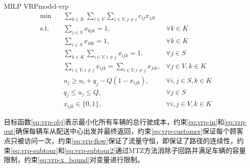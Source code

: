 \begin{model}{MILP VRP}{model-vrp}
\begin{align}
    \min \quad & \sum_{k \in K}\sum_{i \in V}\sum_{j \in V, j \neq i} c_{ij}x_{ijk} & \label{eq:vrp-obj}\\
    \text{s.t.} \quad & \sum_{j \in S} x_{0jk} = 1, & \forall k \in K\label{eq:vrp-in}\\
    \quad & \sum_{i \in S} x_{i0k} = 1, & \forall k \in K\label{eq:vrp-out}\\
    \quad & \sum_{k \in K}\sum_{i \in V, i \neq j} x_{ijk} = 1, & \forall j \in S\label{eq:vrp-customer}\\
    \quad & \sum_{i \in V, i \neq j}x_{ijk} = \sum_{i \in V, i \neq j} x_{jik}, & \forall j \in V, k \in K\label{eq:vrp-flow}\\
    \quad & u_j \geq u_i + q_j -Q(1 - x_{ijk}), & \forall i, j \in S, k \in K\label{eq:vrp-subtour}\\
    \quad & q_j \leq u_j \leq Q, & \forall j \in S\label{eq:vrp-subtour2}\\
    \quad & x_{ijk} \in \{0, 1\}, & \forall i, j \in V, k \in K\label{eq:vrp-x_bound}
\end{align}
\end{model}

目标函数\ref{eq:vrp-obj}表示最小化所有车辆的总行驶成本，约束\ref{eq:vrp-in}和\ref{eq:vrp-out}确保每辆车从配送中心出发并最终返回，约束\ref{eq:vrp-customer}保证每个顾客点只被访问一次，约束\ref{eq:vrp-flow}保证了流量守恒，即保证了路径的连续性，约束\ref{eq:vrp-subtour}和\ref{eq:vrp-subtour2}通过MTZ方法消除子回路并满足车辆的容量限制，约束\ref{eq:vrp-x_bound}对变量进行限制。
